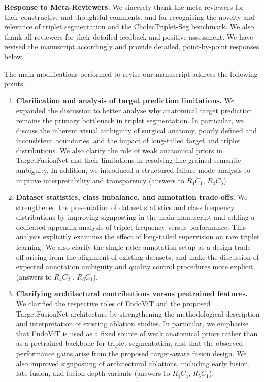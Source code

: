 \documentclass{article}
\begin{document}
\vspace{2mm}
\noindent\textbf{Response to Meta-Reviewers.} 
We sincerely thank the meta-reviewers for their constructive and thoughtful comments, and for recognising the novelty and relevance of triplet segmentation and the CholecTriplet-Seg benchmark. We also thank all reviewers for their detailed feedback and positive assessment. We have revised the manuscript accordingly and provide detailed, point-by-point responses below.
\vspace{2mm}

The main modifications performed to revise our manuscript address the following points:
\begin{enumerate}
    \item \textbf{Clarification and analysis of target prediction limitations.} 
    We expanded the discussion to better analyse why anatomical target prediction remains the primary bottleneck in triplet segmentation. In particular, we discuss the inherent visual ambiguity of surgical anatomy, poorly defined and inconsistent boundaries, and the impact of long-tailed target and triplet distributions. We also clarify the role of weak anatomical priors in TargetFusionNet and their limitations in resolving fine-grained semantic ambiguity. In addition, we introduced a structured failure mode analysis to improve interpretability and transparency (answers to \hyperref[reviewer_4_1]{$R_{4}C_{1}$}, \hyperref[reviewer_4_3]{$R_{4}C_{3}$}).

    \item \textbf{Dataset statistics, class imbalance, and annotation trade-offs.}
    We strengthened the presentation of dataset statistics and class frequency distributions by improving signposting in the main manuscript and adding a dedicated appendix analysis of triplet frequency versus performance. This analysis explicitly examines the effect of long-tailed supervision on rare triplet learning. We also clarify the single-rater annotation setup as a design trade-off arising from the alignment of existing datasets, and make the discussion of expected annotation ambiguity and quality control procedures more explicit (answers to \hyperref[reviewer_4_2]{$R_{4}C_{2}$} , \hyperref[reviewer_6_1]{$R_{6}C_{1}$}).

    \item \textbf{Clarifying architectural contributions versus pretrained features.}
    We clarified the respective roles of EndoViT and the proposed TargetFusionNet architecture by strengthening the methodological description and interpretation of existing ablation studies. In particular, we emphasise that EndoViT is used as a fixed source of weak anatomical priors rather than as a pretrained backbone for triplet segmentation, and that the observed performance gains arise from the proposed target-aware fusion design. We also improved signposting of architectural ablations, including early fusion, late fusion, and fusion-depth variants (answers to \hyperref[reviewer_4_4]{$R_{4}C_{4}$}, \hyperref[reviewer_5_1]{$R_{5}C_{1}$}).


\end{enumerate}
\end{document}
